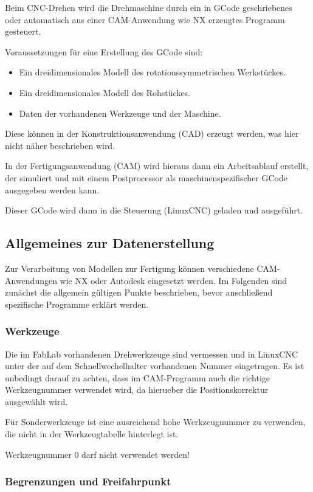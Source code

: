 \documentclass{\basedir/fablab-document}
\begin{document}
Beim CNC-Drehen wird die Drehmaschine durch ein in GCode geschriebenes oder automatisch aus einer CAM-Anwendung wie NX erzeugtes Programm gesteuert.

Voraussetzungen für eine Erstellung des GCode sind:
\begin{itemize}
	\item Ein dreidimensionales Modell des rotationssymmetrischen Werkstückes.
	\item Ein dreidimensionales Modell des Rohstückes.
	\item Daten der vorhandenen Werkzeuge und der Maschine.
\end{itemize}
Diese können in der Konstruktionsanwendung (CAD) erzeugt werden, was hier nicht näher beschrieben wird.

In der Fertigungsanwendung (CAM) wird hieraus dann ein Arbeitsablauf erstellt, der simuliert und mit einem Postprocessor als maschinenspezifischer GCode ausgegeben werden kann.

Dieser GCode wird dann in die Steuerung (LinuxCNC) geladen und ausgeführt.

\subsection{Allgemeines zur Datenerstellung}

Zur Verarbeitung von Modellen zur Fertigung können verschiedene CAM-Anwendungen wie NX oder Autodesk eingesetzt werden. Im Folgenden sind zunächst die allgemein gültigen Punkte beschrieben, bevor anschließend spezifische Programme erklärt werden.

\subsubsection{Werkzeuge}

Die im FabLab vorhandenen Drehwerkzeuge sind vermessen und in LinuxCNC unter der auf dem Schnellwechelhalter vorhandenen Nummer eingetragen. Es ist unbedingt darauf zu achten, dass im CAM-Programm auch die richtige Werkzeugnummer verwendet wird, da hierueber die Positionskorrektur ausgewählt wird.

Für Sonderwerkzeuge ist eine ausreichend hohe Werkzeugnummer zu verwenden, die nicht in der Werkzeugtabelle hinterlegt ist.

Werkzeugnummer 0 darf nicht verwendet werden!

\subsubsection{Begrenzungen und Freifahrpunkt}
\end{document}
